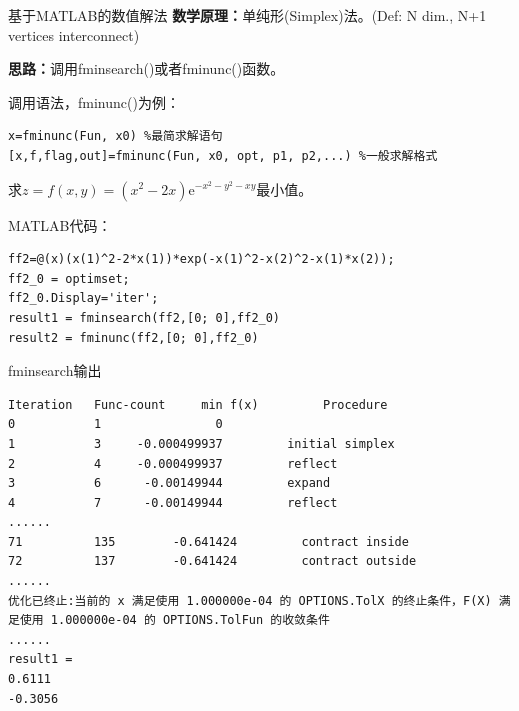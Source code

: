 \documentclass[10pt]{beamer}
\begin{document}
		\begin{frame}[fragile]{基于MATLAB的数值解法}
			\textbf{数学原理：}单纯形(Simplex)法。{\scriptsize(Def: N dim., N+1 vertices interconnect)}
			
			\textbf{思路：}调用fminsearch()或者fminunc()函数。
			
			\begin{block}{调用语法，fminunc()为例：}
\begin{lstlisting}
x=fminunc(Fun, x0) %最简求解语句
[x,f,flag,out]=fminunc(Fun, x0, opt, p1, p2,...) %一般求解格式
\end{lstlisting}
			\end{block}	  
		
		\begin{example}[6-12]
求$z=f(x, y)=\left(x^{2}-2 x\right) \mathrm{e}^{-x^{2}-y^{2}-x y}$最小值。
		\end{example}
			
			\begin{block}{MATLAB代码：}
\begin{lstlisting}
ff2=@(x)(x(1)^2-2*x(1))*exp(-x(1)^2-x(2)^2-x(1)*x(2));
ff2_0 = optimset;
ff2_0.Display='iter';
result1 = fminsearch(ff2,[0; 0],ff2_0)
result2 = fminunc(ff2,[0; 0],ff2_0)
\end{lstlisting}
			\end{block}	 
		
		\end{frame}
	
\begin{frame}[t,fragile]{fminsearch输出}
		
		\begin{lstlisting}
Iteration   Func-count     min f(x)         Procedure
0           1                0         
1           3     -0.000499937         initial simplex
2           4     -0.000499937         reflect
3           6      -0.00149944         expand
4           7      -0.00149944         reflect
......
71          135        -0.641424         contract inside
72          137        -0.641424         contract outside
......
优化已终止:当前的 x 满足使用 1.000000e-04 的 OPTIONS.TolX 的终止条件，F(X) 满足使用 1.000000e-04 的 OPTIONS.TolFun 的收敛条件
......
result1 =
0.6111
-0.3056
\end{lstlisting}
		
\end{frame}
\end{document}
